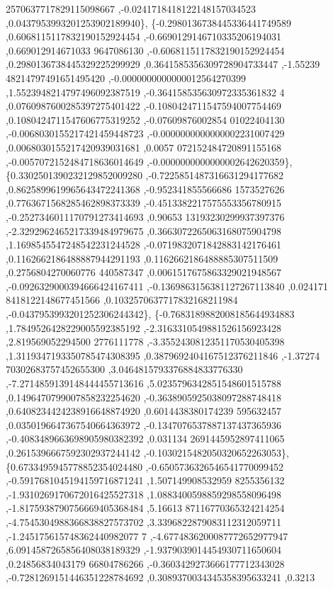 \begin{DoxyCode}
      2570637717829115098667 ,-0.0241718418122148157034523 ,0.0437953993201253902189940\},
\{-0.2980136738445336441749589 ,0.6068115117832190152924454 ,-0.6690129146710335206194031 ,0.669012914671033
      9647086130 ,-0.6068115117832190152924454 ,0.2980136738445329225299929 ,0.3641585356309728904733447 ,-1.55239
      48214797491651495420 ,-0.0000000000000012564270399 ,1.5523948214797496092387519 ,-0.364158535630972335361832
      4 ,0.0760987600285397275401422 ,-0.1080424711547594007754469 ,0.1080424711547606775319252 ,-0.07609876002854
      01022404130 ,-0.0068030155217421459448723 ,-0.0000000000000002231007429 ,0.0068030155217420939031681 ,0.0057
      072152484720891155168 ,-0.0057072152484718636014649 ,-0.0000000000000002642620359\},
\{0.3302501390232129852009280 ,-0.7225851487316631294177682 ,0.8625899619965643472241368 ,-0.952341855566686
      1573527626 ,0.7763671568285462898373339 ,-0.4513382217575553356780915 ,-0.2527346011170791273414693 ,0.90653
      13193230299937397376 ,-2.3292962465217339484979675 ,0.3663072265063168075904798 ,1.1698545547248542231244528
       ,-0.0719832071842883142176461 ,0.1162662186488887944291193 ,0.1162662186488885307511509 ,0.2756804270060776
      440587347 ,0.0061517675863329021948567 ,-0.0926329000394666424167411 ,-0.1369863156381127267113840 ,0.024171
      8418122148677451566 ,0.1032570637717832168211984 ,-0.0437953993201252306244342\},
\{-0.7683189882008185644934883 ,1.7849526428229005592385192 ,-2.3163310549881526156923428 ,2.819569052294500
      2776111778 ,-3.3552430812351170530405398 ,1.3119347193350785474308395 ,0.3879692404167512376211846 ,-1.37274
      70302683757452655300 ,3.0464815793376884833776330 ,-7.2714859139148444455713616 ,5.0235796342851548601515788
       ,0.1496470799007858232254620 ,-0.3638905925038097288748418 ,0.6408234424238916648874920 ,0.6014438380174239
      595632457 ,0.0350196647367540664363972 ,-0.1347076537887137437365936 ,-0.4083489663698905980382392 ,0.031134
      2691445952897411065 ,0.2615396667592302937244142 ,-0.1030215482050320652263053\},
\{0.6733495945778852354024480 ,-0.6505736326546541770099452 ,-0.5917681045194159716871241 ,1.507149908532959
      8255356132 ,-1.9310269170672016425527318 ,1.0883400598859298558096498 ,-1.8175938790756669405368484 ,5.16613
      87116770365324214254 ,-4.7545304988366838827573702 ,3.3396822879083112312059711 ,-1.245175615748362440982077
      7 ,-4.6774836200087772652977947 ,6.0914587265856408038189329 ,-1.9379039014454930711650604 ,0.24856834043179
      66804786266 ,-0.3603429273666177712343028 ,-0.7281269151446351228784692 ,0.3089370034345358395633241 ,0.3213

\end{DoxyCode}

